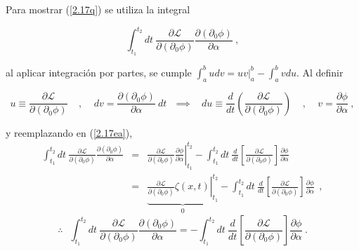 \begin{solution}
Para mostrar (\ref{2.17q}) se utiliza la integral 

\begin{equation}
\int_{t_{1}}^{t_{2}}dt\ \frac{\partial \mathcal{L}}{\partial \left( \partial_{0}\phi \right) }\frac{\partial \left( \partial _{0}\phi \right) }{\partial \alpha }~,  \label{2.17ea}
\end{equation}

\noindent
al aplicar integraci\'{o}n por partes, se cumple $\int_{a}^{b}udv=\left. uv\right\vert _{a}^{b}-\int_{a}^{b}vdu$. Al definir 

\begin{equation*}
u\equiv \frac{\partial \mathcal{L}}{\partial \left( \partial _{0}\phi
\right) }~\ \ ~\ ,~\ \ \ \ dv=\frac{\partial \left( \partial _{0}\phi
\right) }{\partial \alpha }~dt\ ~\ \implies ~\ ~\ du\equiv \frac{d}{dt}%
\left( \frac{\partial \mathcal{L}}{\partial \left( \partial _{0}\phi \right) 
}\right) ~\ \ ~\ ,~\ \ \ \ v=\frac{\partial \phi }{\partial \alpha }~,
\label{2.17eb}
\end{equation*}

\noindent
y reemplazando en (\ref{2.17ea}), 
\begin{eqnarray*}
\int_{t_{1}}^{t_{2}}dt\ \frac{\partial \mathcal{L}}{\partial \left( \partial_{0}\phi \right) }\frac{\partial \left( \partial _{0}\phi \right)}{\partial \alpha } &=&\left. \frac{\partial \mathcal{L}}{\partial \left( \partial_{0}\phi \right) }\frac{\partial \phi }{\partial \alpha }\right\vert_{t_{1}}^{t_{2}}-\int_{t_{1}}^{t_{2}}dt\ \frac{d}{dt}\left[ \frac{\partial \mathcal{L}}{\partial \left( \partial _{0}\phi \right) }\right] \frac{\partial \phi }{\partial \alpha } \\
&=&\underset{0}{\underbrace{\left. \frac{\partial \mathcal{L}}{\partial \left( \partial _{0}\phi \right) }\zeta \left( x,t\right) \right\vert_{t_{1}}^{t_{2}}}}-\int_{t_{1}}^{t_{2}}dt\ \frac{d}{dt}\left[ \frac{\partial \mathcal{L}}{\partial \left( \partial _{0}\phi \right) }\right] \frac{\partial \phi }{\partial \alpha }~\ ,
\end{eqnarray*}
\begin{equation}
\therefore ~\ \ \int_{t_{1}}^{t_{2}}dt\ \frac{\partial \mathcal{L}}{\partial
\left( \partial _{0}\phi \right) }\frac{\partial \left( \partial _{0}\phi
\right) }{\partial \alpha }=-\int_{t_{1}}^{t_{2}}dt\ \frac{d}{dt}\left[ 
\frac{\partial \mathcal{L}}{\partial \left( \partial _{0}\phi \right) }%
\right] \frac{\partial \phi }{\partial \alpha }~.  \label{2.17ec}
\end{equation}


\end{solution}
